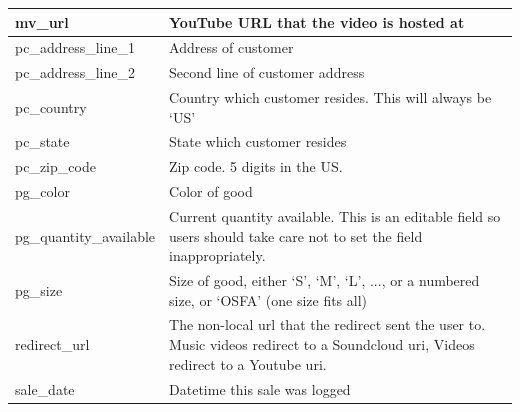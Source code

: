 \documentclass[11pt, a4paper]{report}
\begin{document}
\begin{longtable}{|l|p{10cm}|}
mv\_url                 & YouTube URL that the video is hosted at                                                                                                                               \\ \hline
pc\_address\_line\_1    & Address of customer                                                                                                                                                   \\ \hline
pc\_address\_line\_2    & Second line of customer address                                                                                                                                       \\ \hline
pc\_country             & Country which customer resides. This will always be `US'                                                                                                              \\ \hline
pc\_state               & State which customer resides                                                                                                                                          \\ \hline
pc\_zip\_code           & Zip code. 5 digits in the US.                                                                                                                                         \\ \hline
pg\_color               & Color of good                                                                                                                                                         \\ \hline
pg\_quantity\_available & Current quantity available. This is an editable field so users should take care not to set the field inappropriately.                                                 \\ \hline
pg\_size                & Size of good, either `S', `M', `L', ..., or a numbered size, or `OSFA' (one size fits all)                                                                            \\ \hline
redirect\_url           & The non-local url that the redirect sent the user to. Music videos redirect to a Soundcloud uri, Videos redirect to a Youtube uri.                                    \\ \hline
sale\_date              & Datetime this sale was logged                                                                                                                                         \\ \hline

\end{longtable}
\end{document}
